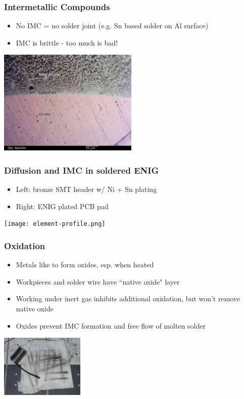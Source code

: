 \documentclass{beamer}
\begin{document}
\begin{frame}
\frametitle{Intermetallic Compounds}
\begin{itemize}
\item No IMC = no solder joint (e.g. Sn based solder on Al surface)
\item IMC is brittle - too much is bad!
\end{itemize}
\begin{center}
\includegraphics[height=5cm,keepaspectratio]{imc.jpg}
\end{center}
\end{frame}

\begin{frame}
\frametitle{Diffusion and IMC in soldered ENIG}
\begin{itemize}
\item Left: bronze SMT header w/ Ni + Sn plating
\item Right: ENIG plated PCB pad
\end{itemize}
\begin{center}
\texttt{[image: element-profile.png]}
\end{center}
\end{frame}

\begin{frame}
\frametitle{Oxidation}
\begin{itemize}
\item Metals like to form oxides, esp. when heated
\item Workpieces and solder wire have ``native oxide" layer
\item Working under inert gas inhibits additional oxidation, but won't remove native oxide
\item Oxides prevent IMC formation and free flow of molten solder
\end{itemize}
\begin{center}
\includegraphics[width=4cm,keepaspectratio]{solder-oxidation.jpg}
\end{center}
\end{frame}
\end{document}
